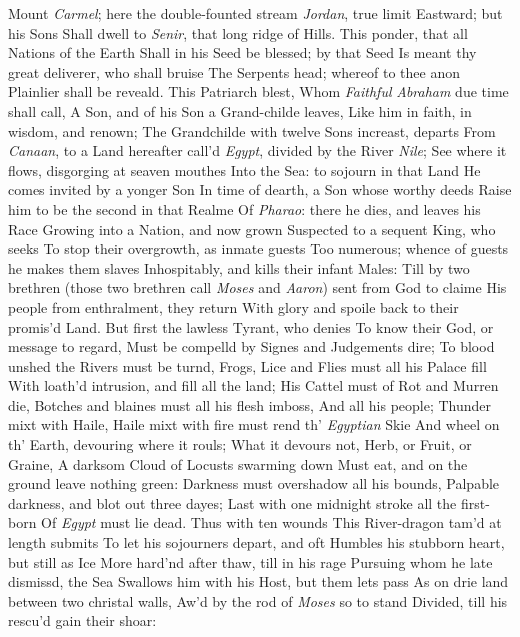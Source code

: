 \documentclass[11pt]{book}
\newcounter {first}
\begin{document}
Mount \textit{Carmel}; here the double-founted stream 
\textit{Jordan}, true limit Eastward; but his Sons 
Shall dwell to \textit{Senir}, that long ridge of Hills. 
This ponder, that all Nations of the Earth 
Shall in his Seed be blessed; by that Seed 
Is meant thy great deliverer, who shall bruise 
The Serpents head; whereof to thee anon 
Plainlier shall be reveald.  This Patriarch blest, 
Whom \textit{Faithful} \textit{Abraham} due time shall call, 
A Son, and of his Son a Grand-childe leaves, 
Like him in faith, in wisdom, and renown; 
The Grandchilde with twelve Sons increast, departs 
From \textit{Canaan}, to a Land hereafter call'd 
\textit{Egypt}, divided by the River \textit{Nile}; 
See where it flows, disgorging at seaven mouthes 
Into the Sea: to sojourn in that Land 
He comes invited by a yonger Son 
In time of dearth, a Son whose worthy deeds 
Raise him to be the second in that Realme 
Of \textit{Pharao}: there he dies, and leaves his Race 
Growing into a Nation, and now grown 
Suspected to a sequent King, who seeks 
To stop their overgrowth, as inmate guests 
Too numerous; whence of guests he makes them slaves 
Inhospitably, and kills their infant Males: 
Till by two brethren (those two brethren call 
\textit{Moses} and \textit{Aaron}) sent from God to claime 
His people from enthralment, they return 
With glory and spoile back to their promis'd Land. 
But first the lawless Tyrant, who denies 
To know their God, or message to regard, 
Must be compelld by Signes and Judgements dire; 
To blood unshed the Rivers must be turnd, 
Frogs, Lice and Flies must all his Palace fill 
With loath'd intrusion, and fill all the land; 
His Cattel must of Rot and Murren die, 
Botches and blaines must all his flesh imboss, 
And all his people; Thunder mixt with Haile, 
Haile mixt with fire must rend th' \textit{Egyptian} Skie 
And wheel on th' Earth, devouring where it rouls; 
What it devours not, Herb, or Fruit, or Graine, 
A darksom Cloud of Locusts swarming down 
Must eat, and on the ground leave nothing green: 
Darkness must overshadow all his bounds, 
Palpable darkness, and blot out three dayes; 
Last with one midnight stroke all the first-born 
Of \textit{Egypt} must lie dead.  Thus with ten wounds 
This River-dragon tam'd at length submits 
To let his sojourners depart, and oft 
Humbles his stubborn heart, but still as Ice 
More hard'nd after thaw, till in his rage 
Pursuing whom he late dismissd, the Sea 
Swallows him with his Host, but them lets pass 
As on drie land between two christal walls, 
Aw'd by the rod of \textit{Moses} so to stand 
Divided, till his rescu'd gain their shoar: 
\end{document}
